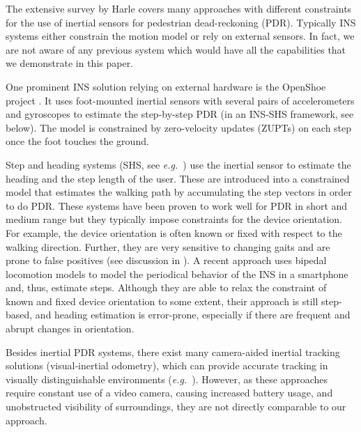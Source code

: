 \documentclass[conference]{ieeetran}
\newcommand{\eg}{\textit{e.g.}}
\begin{document}
The extensive survey by Harle \cite{Harle:2013} covers many approaches with different constraints for the use of inertial sensors for pedestrian dead-reckoning (PDR). Typically INS systems either constrain the motion model or rely on external sensors. In fact, we are not aware of any previous system which would have all the capabilities that we demonstrate in this paper.

One prominent INS solution relying on external hardware is the OpenShoe project \cite{Nilsson+Zachariah+Skog+Handel:2013, Nilsson+Gupta+Handel:2014}. It uses foot-mounted inertial sensors with several pairs of accelerometers and gyroscopes to estimate the step-by-step PDR (in an INS-SHS framework, see below). The model is constrained by zero-velocity updates (ZUPTs) on each step once the foot touches the ground.


Step and heading systems (SHS, see \eg\ \cite{Woodman:2010,Renaudin+Combettes:2014, Kang+Han:2015, Yuan+Yu+Zhang+Wang+Liu:2015, Chen+Meng+Wang+Zhang+Tian+Yang:2015}) use the inertial sensor to estimate the heading and the step length of the user. These are introduced into a constrained model that estimates the walking path by accumulating the step vectors in order to do PDR. These systems have been proven to work well for PDR in short and medium range but they typically impose constraints for the device orientation. For example, the device orientation is often known or fixed with respect to the walking direction. Further, they are very sensitive to changing gaits and are prone to false positives (see discussion in \cite{Harle:2013}). A recent approach \cite{Xiao+Wen+Markham+Trigoni:2014} uses bipedal locomotion models to model the periodical behavior of the INS in a smartphone and, thus, estimate steps. Although they are able to relax the constraint of known and fixed device orientation to some extent, their approach is still step-based, and heading estimation is error-prone, especially if there are frequent and abrupt changes in orientation.


Besides inertial PDR systems, there exist many camera-aided inertial tracking solutions (visual-inertial odometry), which can provide accurate tracking in visually distinguishable environments (\eg\ \cite{Li+Kim+Mourikis:2013, Hesch+Kottas+Bowman+Roumeliotis:2014, Bloesch+Omari+Hutter+Siegwart:2015,Solin+Cortes+Rahtu+Kannala:2018-WACV}). However, as these approaches require constant use of a video camera, causing increased battery usage, and unobstructed visibility of surroundings, they are not directly comparable to our approach.
\end{document}
